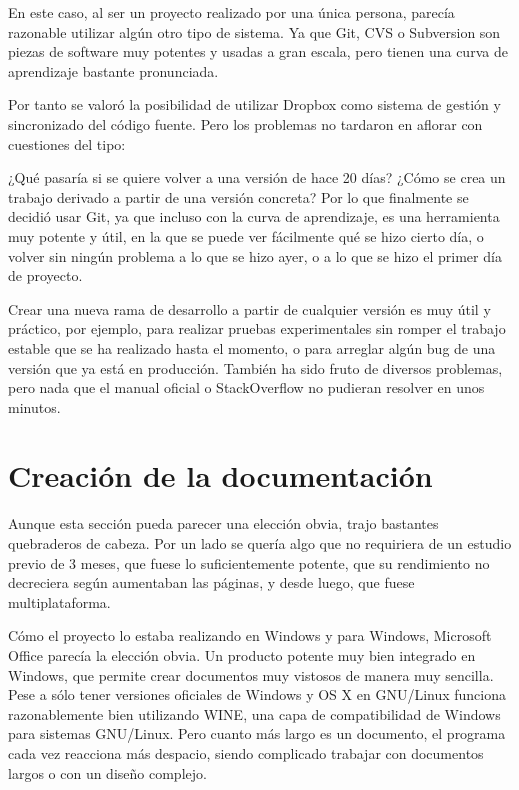 En este caso, al ser un proyecto realizado por una \'unica persona, parec\'ia razonable utilizar alg\'un otro tipo
de sistema. Ya que Git, CVS o Subversion son piezas de software muy potentes y usadas a gran escala, pero tienen
una curva de aprendizaje bastante pronunciada.

Por tanto se valor\'o la posibilidad de utilizar Dropbox como sistema de gesti\'on y sincronizado del c\'odigo fuente.
Pero los problemas no tardaron en aflorar con cuestiones del tipo:

¿Qu\'e pasar\'ia si se quiere volver a una versi\'on de hace 20 d\'ias? ¿C\'omo se crea un trabajo derivado a partir
de una versi\'on concreta? Por lo que finalmente se decidi\'o usar Git, ya que incluso con la curva de aprendizaje,
es una herramienta muy potente y \'util, en la que se puede ver f\'acilmente qu\'e se hizo cierto d\'ia, o volver sin 
ning\'un problema a lo que se hizo ayer, o a lo que se hizo el primer d\'ia de proyecto.

Crear una nueva rama de desarrollo a partir de cualquier versi\'on es muy \'util y pr\'actico, por ejemplo, para
realizar pruebas experimentales sin romper el trabajo estable que se ha realizado hasta el 
momento, o para arreglar alg\'un bug de una versi\'on que ya est\'a en producci\'on. 
Tambi\'en ha sido fruto de diversos problemas, pero nada que el manual 
oficial o StackOverflow no pudieran
resolver en unos minutos.

\section{Creaci\'{o}n de la documentaci\'{o}n}
Aunque esta secci\'{o}n pueda parecer una elecci\'{o}n obvia, trajo bastantes quebraderos de cabeza. Por un lado
se quer\'{i}a algo que no requiriera
de un estudio previo de 3 meses, que fuese lo suficientemente potente, que su rendimiento no decreciera seg\'{u}n aumentaban las 
p\'{a}ginas, y desde luego,
que fuese multiplataforma.

C\'{o}mo el proyecto lo estaba realizando en Windows y para Windows, Microsoft Office
parec\'{i}a la elecci\'{o}n obvia. Un 
producto potente muy bien integrado
en Windows, que permite crear documentos muy vistosos de manera muy sencilla. 
Pese a s\'olo tener versiones oficiales de Windows y OS X en GNU/Linux
funciona razonablemente bien utilizando WINE, una capa de compatibilidad
de Windows para sistemas GNU/Linux. 
Pero cuanto m\'as largo es un documento, el programa cada vez reacciona
m\'as despacio, siendo complicado trabajar con documentos largos o con un dise\~no complejo.

